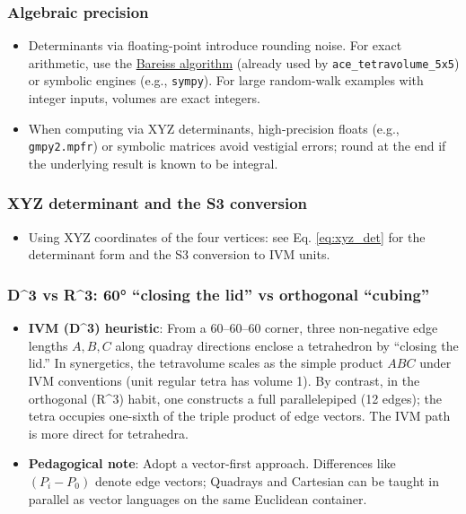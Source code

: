 \documentclass[
]{article}
\providecommand{\tightlist}{%
  \setlength{\itemsep}{0pt}\setlength{\parskip}{0pt}}
\begin{document}
\hypertarget{algebraic-precision}{%
\subsubsection{Algebraic precision}\label{algebraic-precision}}

\begin{itemize}
\tightlist
\item
  Determinants via floating-point introduce rounding noise. For exact
  arithmetic, use the
  \href{https://en.wikipedia.org/wiki/Bareiss_algorithm}{Bareiss
  algorithm} (already used by \texttt{ace\_tetravolume\_5x5}) or
  symbolic engines (e.g., \texttt{sympy}). For large random-walk
  examples with integer inputs, volumes are exact integers.
\item
  When computing via XYZ determinants, high-precision floats (e.g.,
  \texttt{gmpy2.mpfr}) or symbolic matrices avoid vestigial errors;
  round at the end if the underlying result is known to be integral.
\end{itemize}

\hypertarget{xyz-determinant-and-the-s3-conversion}{%
\subsubsection{XYZ determinant and the S3
conversion}\label{xyz-determinant-and-the-s3-conversion}}

\begin{itemize}
\tightlist
\item
  Using XYZ coordinates of the four vertices: see Eq. \eqref{eq:xyz_det}
  for the determinant form and the S3 conversion to IVM units.
\end{itemize}

\hypertarget{d3-vs-r3-60-closing-the-lid-vs-orthogonal-cubing}{%
\subsubsection{D\^{}3 vs R\^{}3: 60° ``closing the lid'' vs orthogonal
``cubing''}\label{d3-vs-r3-60-closing-the-lid-vs-orthogonal-cubing}}

\begin{itemize}
\tightlist
\item
  \textbf{IVM (D\^{}3) heuristic}: From a 60--60--60 corner, three
  non-negative edge lengths \(A,B,C\) along quadray directions enclose a
  tetrahedron by ``closing the lid.'' In synergetics, the tetravolume
  scales as the simple product \(ABC\) under IVM conventions (unit
  regular tetra has volume 1). By contrast, in the orthogonal (R\^{}3)
  habit, one constructs a full parallelepiped (12 edges); the tetra
  occupies one-sixth of the triple product of edge vectors. The IVM path
  is more direct for tetrahedra.
\item
  \textbf{Pedagogical note}: Adopt a vector-first approach. Differences
  like \((P_i-P_0)\) denote edge vectors; Quadrays and Cartesian can be
  taught in parallel as vector languages on the same Euclidean
  container.
\end{itemize}
\end{document}
